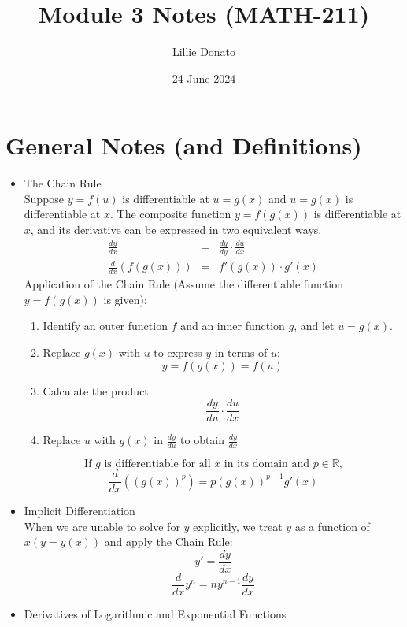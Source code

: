 \documentclass{article}
\title{Module 3 Notes (MATH-211)}
\author{Lillie Donato}
\date{24 June 2024}
\begin{document}
\maketitle

\section*{General Notes (and Definitions)}
\begin{itemize}
    \item The Chain Rule
        \\ Suppose $y = f(u)$ is differentiable at $u = g(x)$ and $u = g(x)$ is differentiable at $x$. The composite function $y = f(g(x))$ is differentiable at $x$, and its derivative can be expressed in two equivalent ways.
        \begin{eqnarray}
            \frac{dy}{dx} &=& \frac{dy}{dy} \cdot \frac{du}{dx} \\
            \frac{d}{dx}\left(f\left(g\left(x\right)\right)\right) &=& f'\left(g\left(x\right)\right) \cdot g'\left(x\right)
        \end{eqnarray}
        Application of the Chain Rule (Assume the differentiable function $y = f(g(x))$ is given):
        \begin{enumerate}
            \item Identify an outer function $f$ and an inner function $g$, and let $u = g(x)$.
            \item Replace $g(x)$ with $u$ to express $y$ in terms of $u$:
            $$y = f(g(x)) = f(u)$$
            \item Calculate the product
            $$\frac{dy}{du} \cdot \frac{du}{dx}$$
            \item Replace $u$ with $g(x)$ in $\frac{dy}{du}$ to obtain $\frac{dy}{dx}$
        \end{enumerate}
        $$\text{If } g \text{ is differentiable for all } x \text{ in its domain and } p \in \mathbb{R} \text{,}$$
        $$\frac{d}{dx}\left(\left(g\left(x\right)\right)^p\right) = p\left(g\left(x\right)\right)^{p - 1}g'\left(x\right)$$
    \item Implicit Differentiation
    \\ When we are unable to solve for $y$ explicitly, we treat $y$ as a function of $x \left(y = y(x)\right)$ and apply the Chain Rule:
    $$y' = \frac{dy}{dx}$$
    $$\frac{d}{dx}y^n = ny^{n - 1}\frac{dy}{dx}$$
    \item Derivatives of Logarithmic and Exponential Functions

\end{itemize}
\end{document}
